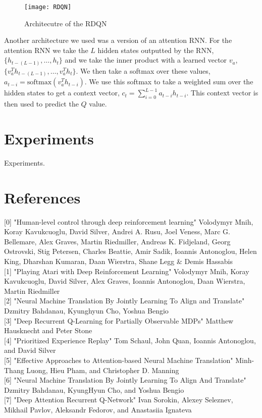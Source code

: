 \documentclass{article}
\begin{document}
\begin{figure}[h]
    \centering
    \texttt{[image: RDQN]}
    \caption{Architecutre of the RDQN}
\end{figure}

Another architecture we used was a version of an attention RNN. For the attention
RNN we take the $L$ hidden states outputted by the RNN, $\{h_{t-(L-1)}, \dots, h_{t}\}$
and we take the inner product with a learned vector $v_a$, $\{v_a^Th_{t-(L-1)}, \dots,
v_a^Th_{t}\}$. We then take a softmax over these values, $a_{t-i} =
\text{softmax}(v_a^Th_{t-i})$. We use this softmax to take a weighted sum over
the hidden states to get a context vector, $c_t = \sum_{i=0}^{L-1}a_{t-i}h_{t-i}$.
This context vector is then used to predict the $Q$ value.

\section{Experiments}
Experiments.

\section*{References}
\small
[0] "Human-level control through deep reinforcement learning" Volodymyr Mnih, Koray Kavukcuoglu, David Silver, Andrei A. Rusu, Joel Veness, Marc G. Bellemare, Alex Graves, Martin Riedmiller, Andreas K. Fidjeland, Georg Ostrovski, Stig Petersen, Charles Beattie, Amir Sadik, Ioannis Antonoglou, Helen King, Dharshan Kumaran, Daan Wierstra, Shane Legg \& Demis Hassabis \\

[1] "Playing Atari with Deep Reinforcement Learning" Volodymyr Mnih, Koray Kavukcuoglu, David Silver, Alex Graves, Ioannis Antonoglou, Daan Wierstra, Martin Riedmiller \\

[2] "Neural Machine Translation By Jointly Learning To Align and Translate" Dzmitry Bahdanau, Kyunghyun Cho, Yoshua Bengio \\

[3] "Deep Recurrent Q-Learning for Partially Observable MDPs" Matthew Hausknecht and Peter Stone \\

[4] "Prioritized Experience Replay" Tom Schaul, John Quan, Ioannis Antonoglou, and David Silver \\

[5] "Effective Approaches to Attention-based Neural Machine Translation" Minh-Thang Luong, Hieu Pham, and Christopher D. Manning \\

[6] "Neural Machine Translation By Jointly Learning To Align And Translate" Dzmitry Bahdanau, KyungHyun Cho, and Yoshua Bengio \\

[7] "Deep Attention Recurrent Q-Network" Ivan Sorokin, Alexey Seleznev, Mikhail Pavlov, Aleksandr Fedorov, and Anastasiia Ignateva \\
\end{document}
